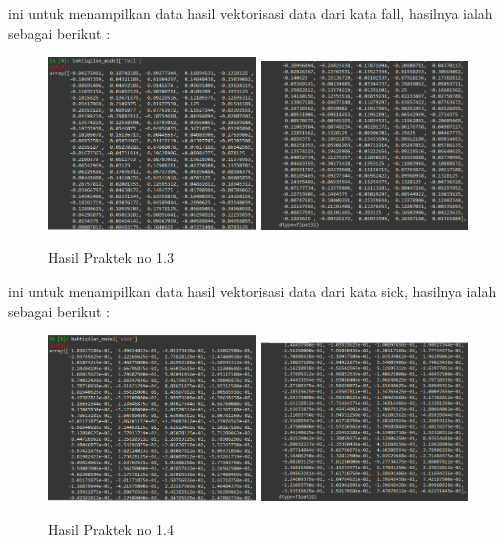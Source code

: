 
ini untuk menampilkan data hasil vektorisasi data dari kata fall, hasilnya ialah sebagai berikut :
\begin{figure}[H]
	\centering
	\includegraphics[width=5.5cm]{figures/1174083/figures5/12.png}
	\includegraphics[width=5.5cm]{figures/1174083/figures5/13.png}
	\caption{Hasil Praktek no 1.3}
\end{figure}


ini untuk menampilkan data hasil vektorisasi data dari kata sick, hasilnya ialah sebagai berikut :
\begin{figure}[H]
	\centering
	\includegraphics[width=5.5cm]{figures/1174083/figures5/14.png}
	\includegraphics[width=5.5cm]{figures/1174083/figures5/15.png}
	\caption{Hasil Praktek no 1.4}
\end{figure}

